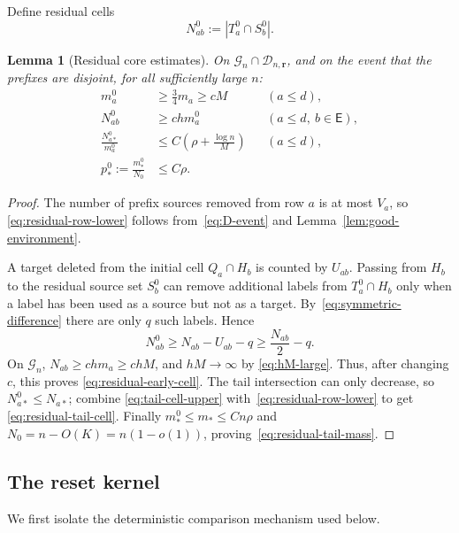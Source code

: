 \documentclass[11pt]{article}
\newcommand{\1}{\mathbf 1}
\newcommand{\cG}{\mathcal G}
\newcommand{\cD}{\mathcal D}
\newtheorem{lemma}[theorem]{Lemma}
\theoremstyle{definition}
\theoremstyle{remark}
\begin{document}
Define residual cells
\begin{equation}\label{eq:residual-cells}
  N_{ab}^0:=|T_a^0\cap S_b^0|.
\end{equation}

\begin{lemma}[Residual core estimates]
\label{lem:residual-core}
On $\cG_n\cap\cD_{n,\mathbf r}$, and on the event that the prefixes are disjoint,
for all sufficiently large $n$:
\begin{align}
 m_a^0&\geq\frac34m_a\geq cM
 &&(a\leq d),
 \label{eq:residual-row-lower}\\
 N_{ab}^0&\geq chm_a^0
 &&(a\leq d,\ b\in\mathsf E),
 \label{eq:residual-early-cell}\\
 \frac{N_{a*}^0}{m_a^0}
 &\leq C\left(\rho+\frac{\log n}{M}\right)
 &&(a\leq d),
 \label{eq:residual-tail-cell}\\
 p_*^0:=\frac{m_*^0}{N_0}&\leq C\rho.
 \label{eq:residual-tail-mass}
\end{align}
\end{lemma}

\begin{proof}
The number of prefix sources removed from row $a$ is at most $V_a$, so
\eqref{eq:residual-row-lower} follows from~\eqref{eq:D-event} and
Lemma~\ref{lem:good-environment}.

A target deleted from the initial cell $Q_a\cap H_b$ is counted by
$U_{ab}$.  Passing from $H_b$ to the residual source set $S_b^0$ can
remove additional labels from $T_a^0\cap H_b$ only when a label has been
used as a source but not as a target.  By~\eqref{eq:symmetric-difference}
there are only $q$ such labels.  Hence
\[
 N_{ab}^0\geq N_{ab}-U_{ab}-q\geq \frac{N_{ab}}2-q.
\]
On $\cG_n$, $N_{ab}\geq chm_a\geq chM$, and $hM\to\infty$ by
\eqref{eq:hM-large}.  Thus, after changing $c$, this proves
\eqref{eq:residual-early-cell}.  The tail intersection can only decrease,
so $N_{a*}^0\leq N_{a*}$; combine
\eqref{eq:tail-cell-upper} with~\eqref{eq:residual-row-lower} to get
\eqref{eq:residual-tail-cell}.  Finally $m_*^0\leq m_*\leq Cn\rho$ and
$N_0=n-O(K)=n(1-o(1))$, proving~\eqref{eq:residual-tail-mass}.
\end{proof}

\subsection{The reset kernel}

We first isolate the deterministic comparison mechanism used below.
\end{document}
